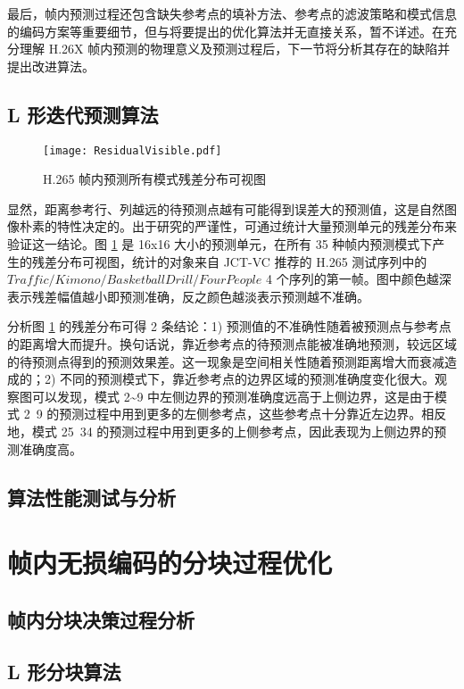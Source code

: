 最后，帧内预测过程还包含缺失参考点的填补方法、参考点的滤波策略和模式信息的编码方案等重要细节，但与将要提出的优化算法并无直接关系，暂不详述。在充分理解 H.26X 帧内预测的物理意义及预测过程后，下一节将分析其存在的缺陷并提出改进算法。

\subsection{L 形迭代预测算法}
\begin{figure}[hbt]
    \centering
    \texttt{[image: ResidualVisible.pdf]}
    \caption{H.265 帧内预测所有模式残差分布可视图}
    \label{fig:ResidualVisible}
\end{figure}
显然，距离参考行、列越远的待预测点越有可能得到误差大的预测值，这是自然图像朴素的特性决定的。出于研究的严谨性，可通过统计大量预测单元的残差分布来验证这一结论。图 \ref{fig:ResidualVisible} 是 16x16 大小的预测单元，在所有 35 种帧内预测模式下产生的残差分布可视图，统计的对象来自 JCT-VC 推荐的 H.265 测试序列中的 $Traffic/Kimono/BasketballDrill/FourPeople$ 4 个序列的第一帧。图中颜色越深表示残差幅值越小即预测准确，反之颜色越淡表示预测越不准确。

分析图 \ref{fig:ResidualVisible} 的残差分布可得 2 条结论：1) 预测值的不准确性随着被预测点与参考点的距离增大而提升。换句话说，靠近参考点的待预测点能被准确地预测，较远区域的待预测点得到的预测效果差。这一现象是空间相关性随着预测距离增大而衰减造成的；2) 不同的预测模式下，靠近参考点的边界区域的预测准确度变化很大。观察图可以发现，模式 2\textasciitilde9 中左侧边界的预测准确度远高于上侧边界，这是由于模式 2~9 的预测过程中用到更多的左侧参考点，这些参考点十分靠近左边界。相反地，模式 25~34 的预测过程中用到更多的上侧参考点，因此表现为上侧边界的预测准确度高。

\subsection{算法性能测试与分析}


\section{帧内无损编码的分块过程优化}

\subsection{帧内分块决策过程分析}

\subsection{L 形分块算法}

